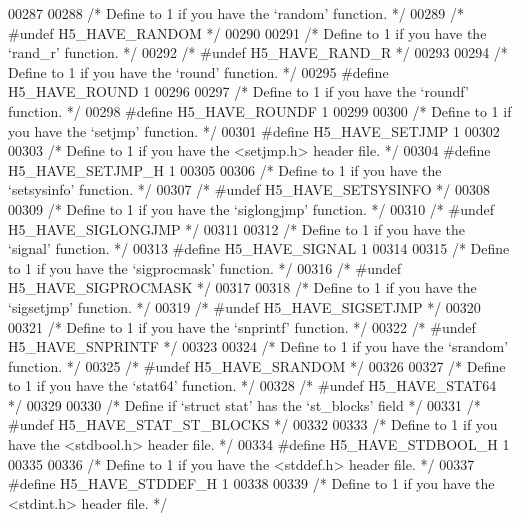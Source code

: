\begin{DoxyCode}
{00287 
00288 \textcolor{comment}{/* Define to 1 if you have the `random' function. */}
00289 \textcolor{comment}{/* #undef H5\_HAVE\_RANDOM */}
00290 
00291 \textcolor{comment}{/* Define to 1 if you have the `rand\_r' function. */}
00292 \textcolor{comment}{/* #undef H5\_HAVE\_RAND\_R */}
00293 
00294 \textcolor{comment}{/* Define to 1 if you have the `round' function. */}
00295 \textcolor{preprocessor}{#define H5\_HAVE\_ROUND 1}
00296 
00297 \textcolor{comment}{/* Define to 1 if you have the `roundf' function. */}
00298 \textcolor{preprocessor}{#define H5\_HAVE\_ROUNDF 1}
00299 
00300 \textcolor{comment}{/* Define to 1 if you have the `setjmp' function. */}
00301 \textcolor{preprocessor}{#define H5\_HAVE\_SETJMP 1}
00302 
00303 \textcolor{comment}{/* Define to 1 if you have the <setjmp.h> header file. */}
00304 \textcolor{preprocessor}{#define H5\_HAVE\_SETJMP\_H 1}
00305 
00306 \textcolor{comment}{/* Define to 1 if you have the `setsysinfo' function. */}
00307 \textcolor{comment}{/* #undef H5\_HAVE\_SETSYSINFO */}
00308 
00309 \textcolor{comment}{/* Define to 1 if you have the `siglongjmp' function. */}
00310 \textcolor{comment}{/* #undef H5\_HAVE\_SIGLONGJMP */}
00311 
00312 \textcolor{comment}{/* Define to 1 if you have the `signal' function. */}
00313 \textcolor{preprocessor}{#define H5\_HAVE\_SIGNAL 1}
00314 
00315 \textcolor{comment}{/* Define to 1 if you have the `sigprocmask' function. */}
00316 \textcolor{comment}{/* #undef H5\_HAVE\_SIGPROCMASK */}
00317 
00318 \textcolor{comment}{/* Define to 1 if you have the `sigsetjmp' function. */}
00319 \textcolor{comment}{/* #undef H5\_HAVE\_SIGSETJMP */}
00320 
00321 \textcolor{comment}{/* Define to 1 if you have the `snprintf' function. */}
00322 \textcolor{comment}{/* #undef H5\_HAVE\_SNPRINTF */}
00323 
00324 \textcolor{comment}{/* Define to 1 if you have the `srandom' function. */}
00325 \textcolor{comment}{/* #undef H5\_HAVE\_SRANDOM */}
00326 
00327 \textcolor{comment}{/* Define to 1 if you have the `stat64' function. */}
00328 \textcolor{comment}{/* #undef H5\_HAVE\_STAT64 */}
00329 
00330 \textcolor{comment}{/* Define if `struct stat' has the `st\_blocks' field */}
00331 \textcolor{comment}{/* #undef H5\_HAVE\_STAT\_ST\_BLOCKS */}
00332 
00333 \textcolor{comment}{/* Define to 1 if you have the <stdbool.h> header file. */}
00334 \textcolor{preprocessor}{#define H5\_HAVE\_STDBOOL\_H 1}
00335 
00336 \textcolor{comment}{/* Define to 1 if you have the <stddef.h> header file. */}
00337 \textcolor{preprocessor}{#define H5\_HAVE\_STDDEF\_H 1}
00338 
00339 \textcolor{comment}{/* Define to 1 if you have the <stdint.h> header file. */}
}
\end{DoxyCode}
